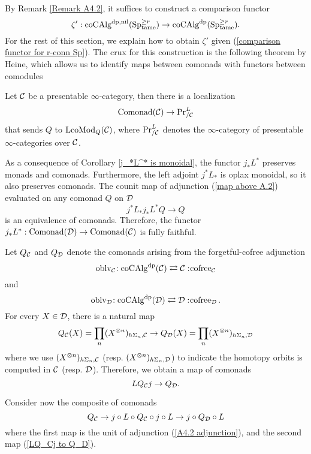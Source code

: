 By Remark \ref{Remark A4.2}, it suffices to construct a comparison functor
$$
\zeta':\operatorname{coCAlg}^{\operatorname{dp}, \operatorname{nil}}(\operatorname{Sp}^{\geq r}_{\operatorname{\operatorname{tame}}})
\to 
\operatorname{coCAlg}^{\operatorname{dp}}(\operatorname{Sp}^{\geq r}_{\operatorname{\operatorname{tame}}}).
$$
For the rest of this section, we explain how to obtain $\zeta'$ given (\ref{comparison functor for r-conn Sp}).
The crux for this construction is the following theorem by Heine, which allows us to identify maps between comonads with functors between comodules
\begin{theorem}
\label{Monads-Alg correspondence}
\cite[Theorem 5.1]{Heine_Monads}
Let ${\mathcal{C}}$ be a presentable $\infty$-category, then there is a localization
$$\operatorname{Comonad}({\mathcal{C}}) \to \operatorname{Pr}^{L}_{/{\mathcal{C}}}$$
that sends $Q$ to $\operatorname{LcoMod}_{Q}({\mathcal{C}})$,
where $\Pr^{L}_{/{\mathcal{C}}}$ denotes the $\infty$-category of presentable $\infty$-categories over ${\mathcal{C}}$.
\end{theorem}

As a consequence of Corollary \ref{j_*L^* is monoidal}, the functor $j_*L^*$ preserves monads and comonads. Furthermore, the left adjoint $j^*L_*$ is oplax monoidal, so it also preserves comonads. 
The counit map of adjunction (\ref{map above A.2})  evaluated on any comonad $Q$ on ${\mathcal{D}}$
\begin{equation}
\label{map above A.2}
    j^*L_*j_*L^*Q  \to  Q
\end{equation}
is an equivalence of comonads. Therefore, the functor $j_*L^*:\operatorname{Comonad}({\mathcal{D}}) \to \operatorname{Comonad}({\mathcal{C}})$ is fully faithful.

Let $Q_{{\mathcal{C}}}$ and $Q_{{\mathcal{D}}}$ denote the comonads arising from the forgetful-cofree adjunction 
$$\operatorname{oblv}_{{\mathcal{C}}}\negmedspace: \operatorname{coCAlg}^{\operatorname{dp}}({\mathcal{C}})\rightleftarrows {\mathcal{C}}:\negmedspace \operatorname{cofree}_{{\mathcal{C}}}$$
and
$$
\operatorname{oblv}_{{\mathcal{D}}}\negmedspace: \operatorname{coCAlg}^{\operatorname{dp}}({\mathcal{D}})\rightleftarrows {\mathcal{D}}:\negmedspace \operatorname{cofree}_{{\mathcal{D}}}.
$$
For every $X\in{\mathcal{D}}$,
there is a natural map
$$
Q_{{\mathcal{C}}}(X)= \prod_{n} (X^{\otimes n})_{h\Sigma_n,{\mathcal{C}}} \to 
Q_{{\mathcal{D}}}(X)= \prod_{n} (X^{\otimes n})_{h\Sigma_n,{\mathcal{D}}}
$$
where we use $(X^{\otimes n})_{h\Sigma_n,{\mathcal{C}}}$ (resp. $(X^{\otimes n})_{h\Sigma_n,{\mathcal{D}}}$) to indicate the homotopy orbits is computed in ${\mathcal{C}}$ (resp. ${\mathcal{D}}$).
Therefore, we obtain a map of comonads 
\begin{equation}
\label{LQ_Cj to Q_D}
    LQ_{{\mathcal{C}}}j \to Q_{{\mathcal{D}}}.
\end{equation}

Consider now the composite of comonads
\begin{equation}
\label{A.3}
    Q_{{\mathcal{C}}} \to 
   j\circ L \circ Q_{{\mathcal{C}}} \circ j\circ L
    \to 
    j\circ Q_{{\mathcal{D}}} \circ L
\end{equation}
where the first map is the unit of adjunction (\ref{A4.2 adjunction}), and the second map (\ref{LQ_Cj to Q_D}).

